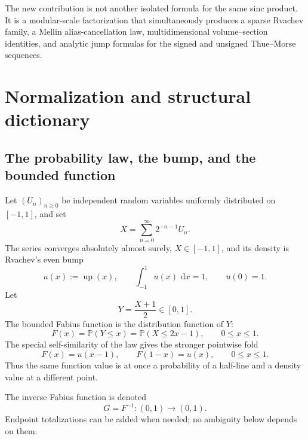 \documentclass[11pt,oneside]{article}
\numberwithin{equation}{section}
\theoremstyle{definition}
\theoremstyle{remark}
\newcommand{\Prob}{\mathbb P}
\newcommand{\Up}{\operatorname{up}}
\newcommand{\dd}{\,\mathrm d}
\begin{document}
\begin{statusbox}
The new contribution is not another isolated formula for the same sinc product.
It is a modular-scale factorization that simultaneously produces a sparse
Rvachev family, a Mellin alias-cancellation law, multidimensional volume--section
identities, and analytic jump formulas for the signed and unsigned Thue--Morse
sequences.
\end{statusbox}

\section{Normalization and structural dictionary}
\label{sec:normalization}

\subsection{The probability law, the bump, and the bounded function}

Let $(U_n)_{n\ge0}$ be independent random variables uniformly distributed on
$[-1,1]$, and set
\begin{equation}
 X=\sum_{n=0}^{\infty}2^{-n-1}U_n.                         \label{eq:X-series}
\end{equation}
The series converges absolutely almost surely, $X\in[-1,1]$, and its density is
Rvachev's even bump
\begin{equation}
 u(x):=\Up(x),\qquad \int_{-1}^{1}u(x)\,\dd x=1,
 \qquad u(0)=1.                                            \label{eq:u-normalization}
\end{equation}
Let
\begin{equation}
 Y=\frac{X+1}{2}\in[0,1].                                  \label{eq:Y-def}
\end{equation}
The bounded Fabius function is the distribution function of $Y$:
\begin{equation}
 F(x)=\Prob(Y\le x)=\Prob(X\le2x-1),\qquad 0\le x\le1.   \label{eq:F-cdf}
\end{equation}
The special self-similarity of the law gives the stronger pointwise fold
\begin{equation}
 F(x)=u(x-1),\qquad F(1-x)=u(x),\qquad 0\le x\le1.          \label{eq:F-u-fold}
\end{equation}
Thus the same function value is at once a probability of a half-line and a
density value at a different point.

The inverse Fabius function is denoted
\begin{equation}
 G=F^{-1}:(0,1)\longrightarrow(0,1).                       \label{eq:G-def}
\end{equation}
Endpoint totalizations can be added when needed; no ambiguity below depends on
them.
\end{document}
